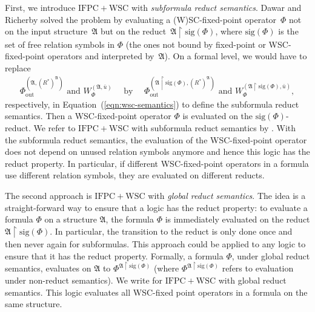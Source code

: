 \documentclass[]{lmcs}
\newcommand{\formA}{\Phi}
\newcommand{\tup}[1]{\bar{#1}}
\newcommand{\Struct}{\mathfrak{A}}
\newcommand{\vertA}{u}
\newcommand{\StructA}{\mathfrak{A}}
\newcommand{\reduct}[2]{#1 \upharpoonright #2}
\newcommand{\sigOf}[1]{\mathrm{sig}(#1)}
\newcommand{\IFPCWSC}{\ensuremath{\mathrm{IFPC{+}WSC}}}
\newcommand{\formOut}{\formA_{\text{out}}}
\begin{document}
First, we introduce \IFPCWSC{} with \emph{subformula reduct semantics}.
Dawar and Richerby solved the problem by evaluating a (W)SC-fixed-point operator~$\formA$ not on the input structure~$\StructA$
but on the reduct~$\reduct{\StructA}{\sigOf{\formA}}$, where $\sigOf{\formA}$ is the set of free relation symbols in $\formA$ (the ones not bound by fixed-point or WSC-fixed-point operators and interpreted by~$\StructA$).
On a formal level, we would
have to replace
\begin{align*}
	\formOut^{(\Struct, (R^*)^\Struct)} \text{ and } 
	W_\formA^{(\StructA, \tup{\vertA})}  \quad \text { by } \quad
	\formOut^{(\reduct{\StructA}{\sigOf{\formA}}, (R^*)^\Struct)} \text{ and }
	W_\formA^{(\reduct{\StructA}{\sigOf{\formA}}, \tup{\vertA})},
\end{align*}
respectively, in Equation~(\ref{eqn:wsc-semantics})
to define the subformula reduct semantics.
Then a WSC-fixed-point operator $\formA$ is evaluated on the $\sigOf{\formA}$-reduct.
We refer to \IFPCWSC{} with subformula reduct semantics by \IFPCWSCsub{}.
With the subformula reduct semantics, the evaluation of the WSC-fixed-point operator does not depend on unused relation symbols anymore
and hence this logic has the reduct property.
In particular, if different WSC-fixed-point operators in a formula use different relation symbols, they are evaluated on different reducts.

The second approach is \IFPCWSC{} with \emph{global reduct semantics}.
The idea is a straight-forward way to ensure that a logic has the reduct property: to evaluate a formula $\formA$ on a structure $\StructA$, the formula $\formA$ is immediately evaluated on the reduct $\reduct{\StructA}{\sigOf{\formA}}$.
In particular, the transition to the reduct is only done once and then never again for subformulas.
This approach could be applied to any logic to ensure that it has the reduct property.
Formally, a formula $\formA$, under global reduct semantics, evaluates on $\StructA$ to $\formA^{\reduct{\StructA}{\sigOf{\formA}}}$ (where $\formA^{\reduct{\StructA}{\sigOf{\formA}}}$ refers to evaluation under non-reduct semantics).
We write \IFPCWSCglob{} for \IFPCWSC{} with global reduct semantics.
This logic evaluates all WSC-fixed point operators in a formula  on the same structure.
\end{document}

